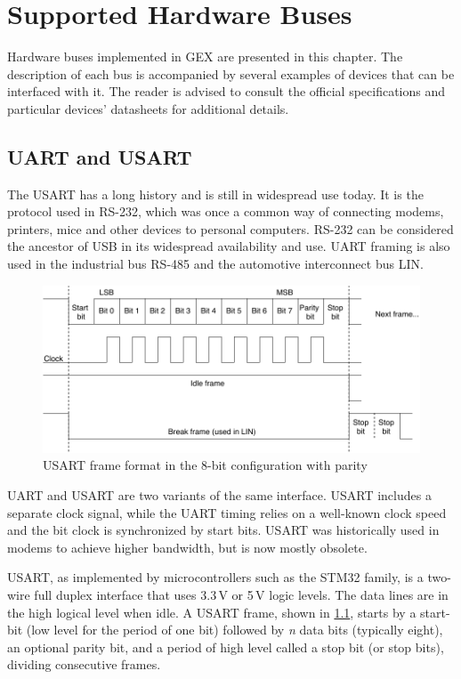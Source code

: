 \chapter{Supported Hardware Buses} \label{ch:hw_buses}

Hardware buses implemented in GEX are presented in this chapter. The description of each bus is accompanied by several examples of devices that can be interfaced with it. The reader is advised to consult the official specifications and particular devices' datasheets for additional details.

\section{UART and USART} \label{sec:theory-usart}

The \acrfull{USART} has a long history and is still in widespread use today. It is the protocol used in RS-232, which was once a common way of connecting modems, printers, mice and other devices to personal computers. RS-232 can be considered the ancestor of \gls{USB} in its widespread availability and use. \gls{UART} framing is also used in the industrial bus RS-485 and the automotive interconnect bus \gls{LIN}.

\begin{figure}[h]
	\centering
	\includegraphics[scale=.9] {img/uart-frame-redraw.pdf}
	\caption[UART frame format]{\label{fig:uart-frame}\gls{USART} frame format in the 8-bit configuration with parity}
\end{figure}

\gls{UART} and \gls{USART} are two variants of the same interface. \gls{USART} includes a separate clock signal, while the \gls{UART} timing relies on a well-known clock speed and the bit clock is synchronized by start bits. \gls{USART} was historically used in modems to achieve higher bandwidth, but is now mostly obsolete.

\gls{USART}, as implemented by microcontrollers such as the STM32 family, is a two-wire full duplex interface that uses 3.3\,V or 5\,V logic levels. The data lines are in the high logical level when idle. A \gls{USART} frame, shown in \cref{fig:uart-frame}, starts by a start-bit (low level for the period of one bit) followed by \textit{n} data bits (typically eight), an optional parity bit, and a period of high level called a stop bit (or stop bits), dividing consecutive frames.

